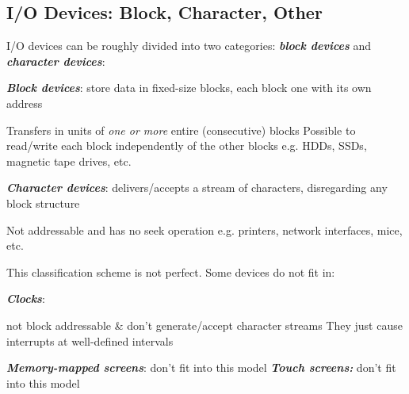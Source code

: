 \subsection*{I/O Devices: Block, Character, Other}

I/O devices can be roughly divided into two categories:
\textbf{ \textit{block devices}} and \textbf{ \textit{character devices}}:

\begin{itemize}
    \vItem
          \textbf{ \textit{Block devices}}: store data in fixed-size blocks, each
          block one with its own address

          \begin{itemize}
              \vItem
                    Transfers in units of  \textit{one or more} entire (consecutive) blocks
              \vItem
                    Possible to read/write each block independently of the other blocks
              \vItem
                    e.g. HDDs, SSDs, magnetic tape drives, etc.
          \end{itemize}
    \vItem
          \textbf{ \textit{Character devices}}: delivers/accepts a stream of
          characters, disregarding any block structure

          \begin{itemize}

              \vItem
                    Not addressable and has no seek operation
              \vItem
                    e.g. printers, network interfaces, mice, etc.
          \end{itemize}
\end{itemize}

This classification scheme is not perfect. Some devices do not fit in:

\begin{itemize}

    \vItem
          \textbf{ \textit{Clocks}}:

          \begin{itemize}

              \vItem
                    not block addressable \& don't generate/accept character streams
              \vItem
                    They just cause interrupts at well-defined intervals
          \end{itemize}
    \vItem
          \textbf{ \textit{Memory-mapped screens}}: don't fit into this model
    \vItem
          \textbf{ \textit{Touch screens:}} don't fit into this model
\end{itemize}

